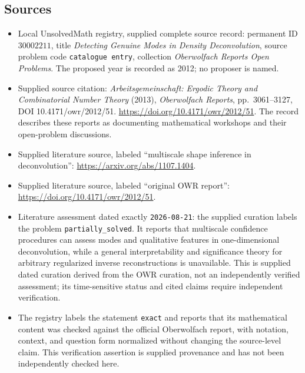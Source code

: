\documentclass[11pt]{article}
\begin{document}
\subsection{Sources}
\begin{itemize}
\item Local UnsolvedMath registry, supplied complete source record: permanent ID \(30002211\), title \emph{Detecting Genuine Modes in Density Deconvolution}, source problem code \texttt{catalogue entry}, collection \emph{Oberwolfach Reports Open Problems}. The proposed year is recorded as 2012; no proposer is named.
\item Supplied source citation: \emph{Arbeitsgemeinschaft: Ergodic Theory and Combinatorial Number Theory} (2013), \emph{Oberwolfach Reports}, pp.\ 3061--3127, DOI 10.4171/owr/2012/51. \url{https://doi.org/10.4171/owr/2012/51}. The record describes these reports as documenting mathematical workshops and their open-problem discussions.
\item Supplied literature source, labeled ``multiscale shape inference in deconvolution'': \url{https://arxiv.org/abs/1107.1404}.
\item Supplied literature source, labeled ``original OWR report'': \url{https://doi.org/10.4171/owr/2012/51}.
\item Literature assessment dated exactly \texttt{2026-08-21}: the supplied curation labels the problem \texttt{partially\_solved}. It reports that multiscale confidence procedures can assess modes and qualitative features in one-dimensional deconvolution, while a general interpretability and significance theory for arbitrary regularized inverse reconstructions is unavailable. This is supplied dated curation derived from the OWR curation, not an independently verified assessment; its time-sensitive status and cited claims require independent verification.
\item The registry labels the statement \texttt{exact} and reports that its mathematical content was checked against the official Oberwolfach report, with notation, context, and question form normalized without changing the source-level claim. This verification assertion is supplied provenance and has not been independently checked here.
\end{itemize}
\end{document}
